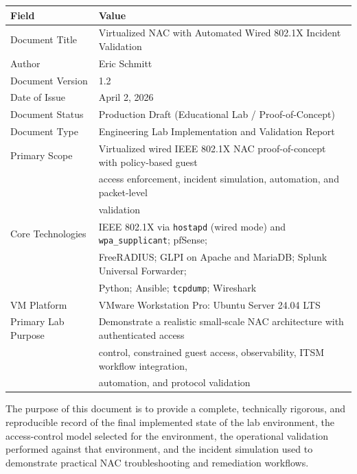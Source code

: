 \documentclass[11pt]{article}
\begin{document}
\begin{center}
\small
\setlength{\tabcolsep}{4pt}
\renewcommand{\arraystretch}{1.15}
\begin{tabularx}{0.92\textwidth}{|p{}|X|}
\hline
\textbf{Field} & \textbf{Value} \\
\hline
Document Title & Virtualized NAC with Automated Wired 802.1X Incident Validation \\
\hline
Author & Eric Schmitt \\
\hline
Document Version & 1.2 \\
\hline
Date of Issue & April 2, 2026 \\
\hline
Document Status & Production Draft (Educational Lab / Proof-of-Concept) \\
\hline
Document Type & Engineering Lab Implementation and Validation Report \\
\hline
Primary Scope & Virtualized wired IEEE 802.1X NAC proof-of-concept with policy-based guest \\
& access enforcement, incident simulation, automation, and packet-level \\
& validation \\
\hline
Core Technologies & IEEE 802.1X via \texttt{hostapd} (wired mode) and \texttt{wpa\_supplicant}; pfSense; \\
& FreeRADIUS; GLPI on Apache and MariaDB; Splunk Universal Forwarder; \\
& Python; Ansible; \texttt{tcpdump}; Wireshark \\
\hline
VM Platform & VMware Workstation Pro: Ubuntu Server 24.04 LTS \\
\hline
Primary Lab Purpose & Demonstrate a realistic small-scale NAC architecture with authenticated access \\
& control, constrained guest access, observability, ITSM workflow integration, \\
& automation, and protocol validation \\
\hline
\end{tabularx}
\end{center}

The purpose of this document is to provide a complete, technically rigorous, and reproducible record of the final implemented state of the lab environment, the access-control model selected for the environment, the operational validation performed against that environment, and the incident simulation used to demonstrate practical NAC troubleshooting and remediation workflows.
\end{document}
